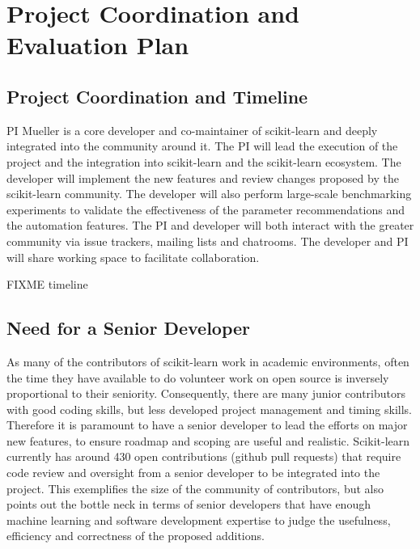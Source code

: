 
\section{Project Coordination and Evaluation Plan}
\subsection{Project Coordination and Timeline}
PI Mueller is a core developer and co-maintainer of scikit-learn and deeply integrated
into the community around it. The PI will lead the execution of the project and the integration
into scikit-learn and the scikit-learn ecosystem.
The developer will implement the new features and review changes proposed by
the scikit-learn community. The developer will also perform large-scale
benchmarking experiments to validate the effectiveness of the parameter
recommendations and the automation features.  The PI and developer will both
interact with the greater community via issue trackers, mailing lists and
chatrooms. The developer and PI will share working space to facilitate
collaboration.

FIXME timeline

\subsection{Need for a Senior Developer}
As many of the contributors of scikit-learn work in academic environments,
often the time they have available to do volunteer work on open source is
inversely proportional to their seniority.
Consequently, there are many junior contributors with good coding skills,
but less developed project management and timing skills.
Therefore it is paramount to have a senior developer to lead the efforts
on major new features, to ensure roadmap and scoping are useful and realistic.
Scikit-learn currently has around 430 open contributions (github pull requests)
that require code review and oversight from a senior developer to be integrated
into the project. This exemplifies the size of the community of contributors,
but also points out the bottle neck in terms of senior developers that
have enough machine learning and software development expertise to judge
the usefulness, efficiency and correctness of the proposed additions.


